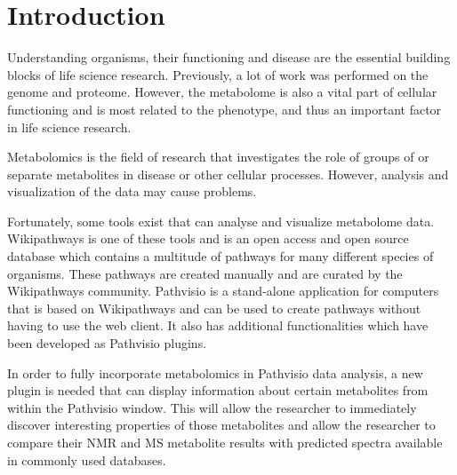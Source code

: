 \documentclass{bioinfo}
\begin{document}
\section{Introduction}
Understanding organisms, their functioning and disease are the essential building blocks of life science research. Previously, a lot of work was performed on the genome and proteome. However, the metabolome is also a vital part of cellular functioning and is most related to the phenotype, and thus an important factor in life science research.

Metabolomics is the field of research that investigates the role of groups of or separate metabolites in disease or other cellular processes. However, analysis and visualization of the data may cause problems.

Fortunately, some tools exist that can analyse and visualize metabolome data. Wikipathways is one of these tools and is an open access and open source database which contains a multitude of pathways for many different species of organisms. These pathways are created manually and are curated by the Wikipathways community. \cite{kelder} Pathvisio \cite{iersel} is a stand-alone application for computers that is based on Wikipathways and can be used to create pathways without having to use the web client. It also has additional functionalities which have been developed as Pathvisio plugins.

In order to fully incorporate metabolomics in Pathvisio data analysis, a new plugin is needed that can display information about certain metabolites from within the Pathvisio window. This will allow the researcher to immediately discover interesting properties of those metabolites and allow the researcher to compare their NMR and MS metabolite results with predicted spectra available in commonly used databases.
\end{document}

